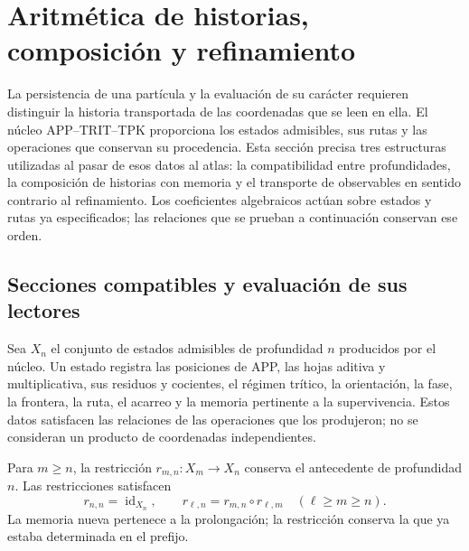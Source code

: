 \section{Aritmética de historias, composición y refinamiento}
\label{vi:vi:hist:seccion-principal}

La persistencia de una partícula y la evaluación de su carácter requieren
distinguir la historia transportada de las coordenadas que se leen en ella.
El núcleo APP--TRIT--TPK proporciona los estados admisibles, sus rutas y
las operaciones que conservan su procedencia. Esta sección precisa tres
estructuras utilizadas al pasar de esos datos al atlas: la compatibilidad
entre profundidades, la composición de historias con memoria y el
transporte de observables en sentido contrario al refinamiento.
Los coeficientes algebraicos actúan sobre estados y rutas ya especificados;
las relaciones que se prueban a continuación conservan ese orden.

\subsection{Secciones compatibles y evaluación de sus lectores}
\label{vi:hist:seccion}

Sea \(X_n\) el conjunto de estados admisibles de profundidad \(n\)
producidos por el núcleo. Un estado registra las posiciones de APP, las
hojas aditiva y multiplicativa, sus residuos y cocientes, el régimen
trítico, la orientación, la fase, la frontera, la ruta, el acarreo y la
memoria pertinente a la supervivencia. Estos datos satisfacen las
relaciones de las operaciones que los produjeron; no se consideran un
producto de coordenadas independientes.

Para \(m\ge n\), la restricción
\(r_{m,n}:X_m\longrightarrow X_n\) conserva el antecedente de profundidad
\(n\). Las restricciones satisfacen
\begin{equation}
 r_{n,n}=\operatorname{id}_{X_n},\qquad
 r_{\ell,n}=r_{m,n}\circ r_{\ell,m}
 \quad(\ell\ge m\ge n).
 \label{vi:vi:hist:restricciones}
\end{equation}
La memoria nueva pertenece a la prolongación; la restricción conserva la
que ya estaba determinada en el prefijo.

